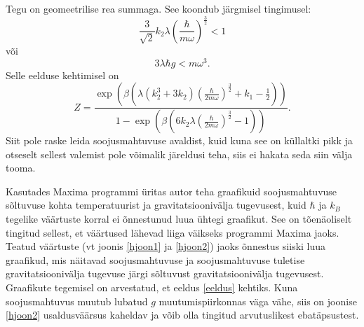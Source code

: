 \documentclass{trkut}%
\begin{document}
Tegu on geomeetrilise rea summaga. See koondub järgmisel tingimusel:
\begin{equation}
    \frac{3}{\sqrt{2}}k_2\lambda \left(\frac{\hbar}{m\omega}\right)^{\frac{3}{2}}<1
\end{equation}
või
\begin{equation} \label{eeldus}
    3 \lambda \hbar g < m \omega^3.
\end{equation}
Selle eelduse kehtimisel on
\begin{equation}
    Z=\frac{\exp\left( \beta \left(  \lambda (k_2^3+3k_2)\left(\frac{\hbar}{2m\omega}\right)^{\frac{3}{2}} +k_1 -\frac{1}{2}\right)\right)}{1-\exp \left( \beta\left( 6 k_2 \lambda \left( \frac{\hbar}{2m\omega}\right)^{\frac{3}{2}} - 1 \right)\right)}.
\end{equation}
Siit pole raske leida soojusmahtuvuse avaldist, kuid kuna see on küllaltki pikk ja otseselt sellest valemist pole võimalik järeldusi teha, siis ei hakata seda siin välja tooma.

Kasutades Maxima programmi üritas autor teha graafikuid soojusmahtuvuse sõltuvuse kohta temperatuurist ja gravitatsioonivälja tugevusest, kuid $\hbar$ ja $k_B$ tegelike väärtuste korral ei õnnestunud luua ühtegi graafikut.
See on tõenäoliselt tingitud sellest, et väärtused lähevad liiga väikseks programmi Maxima jaoks.
Teatud väärtuste (vt joonis \ref{hjoon1} ja \ref{hjoon2}) jaoks õnnestus siiski luua graafikud, mis näitavad soojusmahtuvuse ja soojusmahtuvuse tuletise gravitatsioonivälja tugevuse järgi sõltuvust gravitatsioonivälja tugevusest.
Graafikute tegemisel on arvestatud, et eeldus \eqref{eeldus} kehtiks.
Kuna soojusmahtuvus muutub lubatud $g$ muutumispiirkonnas väga vähe, siis on joonise \ref{hjoon2} usaldusväärsus kaheldav ja võib olla tingitud arvutuslikest ebatäpsustest.
\end{document}
